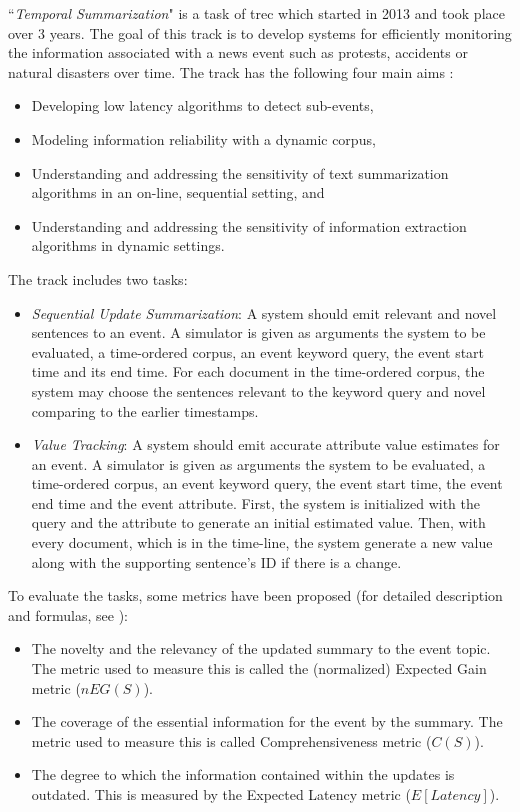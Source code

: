 ``\textit{Temporal Summarization}" is a task of \ac{trec} which started in 2013 and took place over 3 years.
The goal of this track is to develop systems for efficiently monitoring the information associated with a news event such as protests, accidents or natural disasters over time. 
The track has the following four main aims \citep{13-aslam-al}:
\begin{itemize}
	\item Developing low latency algorithms to detect sub-events,
	\item Modeling information reliability with a dynamic corpus,
	\item Understanding and addressing the sensitivity of text summarization algorithms in an on-line, sequential setting, and
	\item Understanding and addressing the sensitivity of information extraction algorithms in dynamic settings.
\end{itemize}
The track includes two tasks:
\begin{itemize}
	\item \textit{Sequential Update Summarization}: A system should emit relevant and novel sentences to an
	event. 
	A simulator is given as arguments the system to be evaluated, a time-ordered corpus, an event keyword query, the event start time and its end time.
	For each document in the time-ordered corpus, the system may choose the sentences relevant to the keyword query and novel comparing to the earlier timestamps.
	
	\item \textit{Value Tracking}: A system should emit accurate attribute value estimates for an event. 
	A simulator is given as arguments the system to be evaluated, a time-ordered corpus, an event keyword query, the event start time, the event end time and the event attribute. 
	First, the system is initialized with the query and the attribute to generate an initial estimated value. 
	Then, with every document, which is in the time-line, the system generate a new value along with the supporting sentence's ID if there is a change.
	
\end{itemize}
To evaluate the tasks, some metrics have been proposed (for detailed description and formulas, see \citep{13-aslam-al}):
\begin{itemize}
	\item The novelty and the relevancy of the updated summary to the event topic.
	The metric used to measure this is called the (normalized) Expected Gain metric
	($nEG(S)$).
	\item The coverage of the essential information for the event by the summary. 
	The metric used to measure this is called Comprehensiveness metric ($ C(S) $).
	
	\item The degree to which the information contained within the updates is outdated.
	This is measured by the Expected Latency metric ($ E[Latency] $).
	
\end{itemize}

